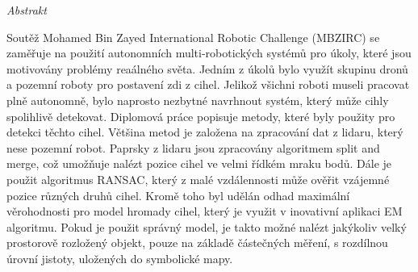 \vfill
\begin{center}
{\it \large Abstrakt}
\vspace{0.2cm}

\begin{minipage}{0.8\textwidth}{
Soutěž Mohamed Bin Zayed International Robotic Challenge (MBZIRC) se zaměřuje na použití autonomních multi-robotických systémů pro úkoly, které jsou motivovány problémy reaálného světa. Jedním z úkolů bylo využít skupinu dronů a pozemní roboty pro postavení zdi z cihel. Jelikož všichni roboti museli pracovat plně autonomně, bylo naprosto nezbytné navrhnout systém, který může cihly spolihlivě detekovat. Diplomová práce popisuje metody, které byly použity pro detekci těchto cihel. Většina metod je založena na zpracování dat z lidaru, který nese pozemní robot. Paprsky z lidaru jsou zpracovány algoritmem split and merge, což umožňuje nalézt pozice cihel ve velmi řídkém mraku bodů. Dále je použit algoritmus RANSAC, který z malé vzdálennosti může ověřit vzájemné pozice různých druhů cihel. Kromě toho byl udělán odhad maximální věrohodnosti pro model hromady cihel, který je využit v inovativní aplikaci EM algoritmu. Pokud je použit správný model, je takto možné nalézt jakýkoliv velký prostorově rozložený objekt, pouze na základě částečných měření, s rozdílnou úrovní jistoty, uložených do symbolické mapy.
}
\end{minipage}
\end{center}
\vfill
\vspace{1cm}
\newpage{}
